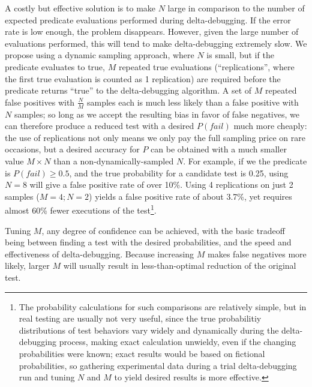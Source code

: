 A costly but effective solution is to make $N$ large in comparison to
the number of expected predicate evaluations performed during
delta-debugging.  If the error rate is low enough, the problem
disappears.  However, given the large number of evaluations performed,
this will tend to make delta-debugging extremely slow.  We propose
using a dynamic sampling approach, where $N$ is small, but if the
predicate evaluates to true, $M$ repeated true evaluations
(``replications'', where the first true evaluation is counted as 1 replication) are
required before the predicate returns ``true'' to the delta-debugging
algorithm.  A set of $M$ repeated false positives with
$\frac{N}{M}$ samples each is much less likely than a false positive
with $N$ samples; so long as we accept the resulting bias in favor of
false negatives, we can therefore produce a reduced test with a
desired $P(fail)$ much more cheaply:  the use of replications not only
means we only pay the full sampling price on rare occasions, but a
desired accuracy for $P$ can be obtained with a much smaller value $M
\times N$ than a non-dynamically-sampled $N$.  For example, if we the predicate
is $P(fail) \geq 0.5$, and the true probability for a candidate test
is 0.25, using $N=8$ will give a false positive rate of over 10\%.
Using 4 replications on just 2 samples ($M=4;N=2$) yields a false
positive rate of about 3.7\%, yet requires almost 60\% fewer
executions of the test\footnote{The probability calculations for such comparisons
  are relatively simple, but in real testing are
  usually not very useful, since the true
  probabilitiy distributions of test behaviors vary widely and
  dynamically during the
  delta-debugging process, making exact calculation unwieldy, even if
  the changing probabilities were known; exact results would be based on fictional
  probabilities, so gathering experimental data during a trial
  delta-debugging run and tuning $N$ and $M$ to yield desired
  results is  more effective.}.

Tuning $M$, any degree of confidence can be achieved, with
the basic tradeoff being between finding a test with the desired
probabilities, and the speed and effectiveness of delta-debugging.
Because increasing $M$ makes false negatives more likely, larger $M$
will usually result in less-than-optimal reduction of the original
test.